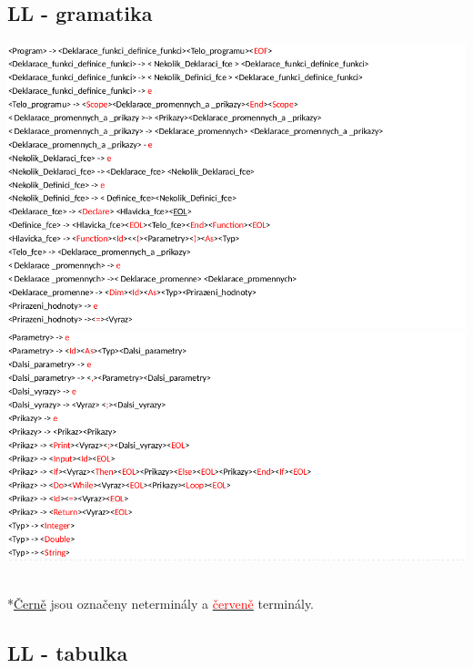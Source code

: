 \documentclass[11pt]{article}
\begin{document}
	\subsection{LL - gramatika}
	\begin{center}
		\includegraphics[scale = 0.55]{LL1.png}
		\includegraphics[scale = 0.55]{LL2.png}\\
	\end{center}
	\vfill
	\noindent\hrulefill \\
	\vspace{0.5 cm}
	*\underline{Černě} jsou označeny neterminály a \underline{\textcolor{red}{červeně}} terminály.	
	
	
	\subsection{LL - tabulka}
	\begin{center}
	\end{center}
	\vfill
	
\end{document}
